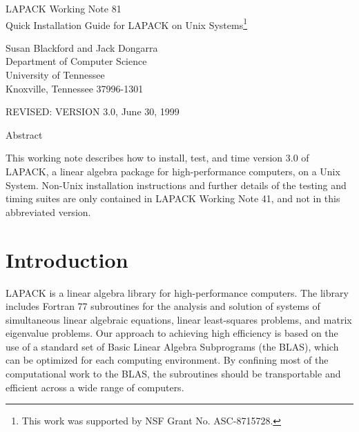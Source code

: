 \begin{center}
  {\Large LAPACK Working Note 81\\
  Quick Installation Guide for LAPACK on Unix Systems\footnote{This work was
 supported by NSF Grant No. ASC-8715728.}}
\end{center}
\begin{center}
  Susan Blackford and Jack Dongarra\\
  Department of Computer Science \\
  University of Tennessee \\
  Knoxville, Tennessee  37996-1301 \\
\end{center}
\begin{center}
  REVISED:  VERSION 3.0, June 30, 1999
\end{center}

\begin{center}
Abstract
\end{center}
This working note describes how to install, test, and time version 3.0
of LAPACK, a linear algebra package for high-performance
computers, on a Unix System.  Non-Unix installation instructions and
further details of the testing and timing suites are only contained in
LAPACK Working Note 41, and not in this abbreviated version.
\newpage

\tableofcontents

\newpage

\section{Introduction}

\dent
LAPACK is a linear algebra library for high-performance
computers.
The library includes Fortran 77 subroutines for 
the analysis and solution of systems of simultaneous linear algebraic
equations, linear least-squares problems, and matrix eigenvalue
problems.
Our approach to achieving high efficiency is based on the use of
a standard set of Basic Linear Algebra Subprograms (the BLAS),
which can be optimized for each computing environment.
By confining most of the computational work to the BLAS,
the subroutines should be 
transportable and efficient across a wide range of computers.

